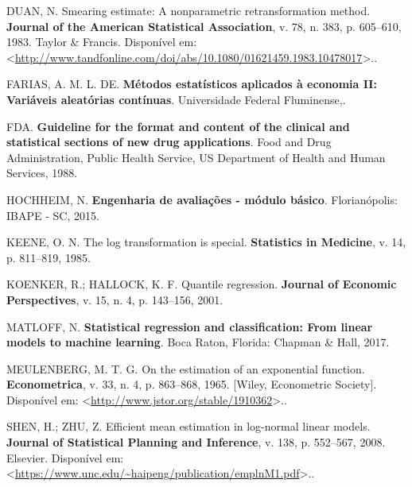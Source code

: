 \documentclass[a4paper]{article}
\begin{document}
\hypertarget{ref-Duan}{}
DUAN, N. Smearing estimate: A nonparametric retransformation method.
\textbf{Journal of the American Statistical Association}, v. 78, n. 383,
p. 605--610, 1983. Taylor \& Francis. Disponível em:
\textless{}\url{http://www.tandfonline.com/doi/abs/10.1080/01621459.1983.10478017}\textgreater{}..

\hypertarget{ref-farias}{}
FARIAS, A. M. L. DE. \textbf{Métodos estatísticos aplicados à economia
II: Variáveis aleatórias contínuas}. Universidade Federal Fluminense,.

\hypertarget{ref-fda}{}
FDA. \textbf{Guideline for the format and content of the clinical and
statistical sections of new drug applications}. Food and Drug
Administration, Public Health Service, US Department of Health and Human
Services, 1988.

\hypertarget{ref-hochheim}{}
HOCHHEIM, N. \textbf{Engenharia de avaliações - módulo básico}.
Florianópolis: IBAPE - SC, 2015.

\hypertarget{ref-keene}{}
KEENE, O. N. The log transformation is special. \textbf{Statistics in
Medicine}, v. 14, p. 811--819, 1985.

\hypertarget{ref-koenker}{}
KOENKER, R.; HALLOCK, K. F. Quantile regression. \textbf{Journal of
Economic Perspectives}, v. 15, n. 4, p. 143--156, 2001.

\hypertarget{ref-matloff2017}{}
MATLOFF, N. \textbf{Statistical regression and classification: From
linear models to machine learning}. Boca Raton, Florida: Chapman \&
Hall, 2017.

\hypertarget{ref-meulenberg1965}{}
MEULENBERG, M. T. G. On the estimation of an exponential function.
\textbf{Econometrica}, v. 33, n. 4, p. 863--868, 1965. {[}Wiley,
Econometric Society{]}. Disponível em:
\textless{}\url{http://www.jstor.org/stable/1910362}\textgreater{}..

\hypertarget{ref-shen}{}
SHEN, H.; ZHU, Z. Efficient mean estimation in log-normal linear models.
\textbf{Journal of Statistical Planning and Inference}, v. 138, p.
552--567, 2008. Elsevier. Disponível em:
\textless{}\url{https://www.unc.edu/~haipeng/publication/emplnM1.pdf}\textgreater{}..
\end{document}
